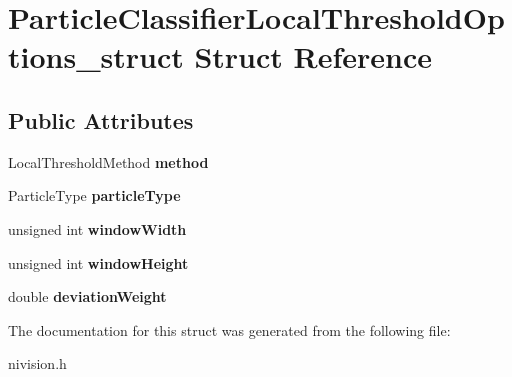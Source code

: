 \hypertarget{structParticleClassifierLocalThresholdOptions__struct}{
\section{ParticleClassifierLocalThresholdOptions\_\-struct Struct Reference}
\label{structParticleClassifierLocalThresholdOptions__struct}
}
\subsection*{Public Attributes}
\begin{DoxyCompactItemize}
\item 
\hypertarget{structParticleClassifierLocalThresholdOptions__struct_abcbc0fb80152f3dc098774654fa7e7ff}{
LocalThresholdMethod {\bfseries method}}
\label{structParticleClassifierLocalThresholdOptions__struct_abcbc0fb80152f3dc098774654fa7e7ff}

\item 
\hypertarget{structParticleClassifierLocalThresholdOptions__struct_ac04e4f343af344353111e513b6bc85e2}{
ParticleType {\bfseries particleType}}
\label{structParticleClassifierLocalThresholdOptions__struct_ac04e4f343af344353111e513b6bc85e2}

\item 
\hypertarget{structParticleClassifierLocalThresholdOptions__struct_a8cc337320df02bcd97fa8956c3a93d4c}{
unsigned int {\bfseries windowWidth}}
\label{structParticleClassifierLocalThresholdOptions__struct_a8cc337320df02bcd97fa8956c3a93d4c}

\item 
\hypertarget{structParticleClassifierLocalThresholdOptions__struct_a946f034b7a693d96ca645833b441f911}{
unsigned int {\bfseries windowHeight}}
\label{structParticleClassifierLocalThresholdOptions__struct_a946f034b7a693d96ca645833b441f911}

\item 
\hypertarget{structParticleClassifierLocalThresholdOptions__struct_adb6db5d96fc3d69833cf43bfdc247fac}{
double {\bfseries deviationWeight}}
\label{structParticleClassifierLocalThresholdOptions__struct_adb6db5d96fc3d69833cf43bfdc247fac}

\end{DoxyCompactItemize}


The documentation for this struct was generated from the following file:\begin{DoxyCompactItemize}
\item 
nivision.h\end{DoxyCompactItemize}
